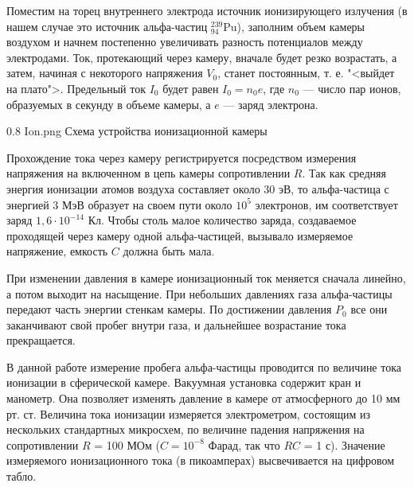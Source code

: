 Поместим на торец внутреннего электрода источник
ионизирующего излучения (в нашем случае это источник
альфа-частиц $ ^{239}_{94} $Pu), заполним объем камеры воздухом и начнем
постепенно увеличивать разность потенциалов между электродами. Ток, протекающий через камеру, вначале будет резко возрастать, а затем, начиная с некоторого напряжения $ V_0 $, станет постоянным, т. е. "<выйдет на плато">.  Предельный ток $ I_0 $ будет равен $ I_0 = n_0e $,
где $ n_0 $ --- число пар ионов, образуемых в секунду в объеме камеры, а $ e $ --- заряд электрона.

\pic
{0.8\linewidth}
{Ion.png}
{Схема устройства ионизационной камеры}

Прохождение тока через камеру регистрируется посредством измерения напряжения на включенном в цепь камеры сопротивлении $ R $.
Так как средняя энергия ионизации атомов воздуха составляет около 30 эВ, то альфа-частица с энергией 3 МэВ образует на своем пути около $ 10^5 $ электронов, им соответствует заряд $1,6 \cdot 10^{-14} $ Кл. Чтобы
столь малое количество заряда, создаваемое проходящей через камеру одной альфа-частицей, вызывало измеряемое напряжение, емкость $ C $
должна быть мала.

При изменении давления в камере ионизационный ток меняется сначала линейно, а потом выходит на насыщение. При небольших давлениях газа
альфа-частицы передают часть энергии стенкам камеры. По достижении
давления $ P_0 $ все они заканчивают свой пробег внутри газа, и дальнейшее возрастание тока прекращается.

В данной работе измерение пробега альфа-частицы проводится по величине тока ионизации в сферической камере. Вакуумная установка содержит кран и манометр. Она позволяет изменять давление в камере от атмосферного до 10 мм рт. ст.
Величина тока ионизации измеряется электрометром, состоящим из
нескольких стандартных микросхем, по величине падения напряжения
на сопротивлении $ R $ = 100 МОм ($ C = 10^{-8} $ Фарад, так что $ RC $ = 1 с).
Значение измеряемого ионизационного тока (в пикоамперах) высвечивается на цифровом табло.

\newpage

